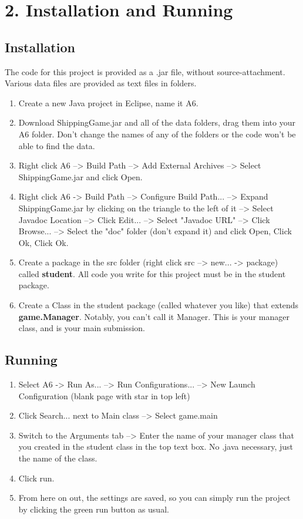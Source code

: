 \documentclass[11pt]{article}
\begin{document}
\newpage
\section{2. Installation and Running}
\subsection{Installation}
The code for this project is provided as a .jar file, without source-attachment. Various data files are provided as text files in folders.
\begin{enumerate}
\item Create a new Java project in Eclipse, name it A6.
\item Download ShippingGame.jar and all of the data folders, drag them into your A6 folder. Don't change the names of any of the folders or the code won't be able to find the data.
\item Right click A6 --> Build Path --> Add External Archives --> Select ShippingGame.jar and click Open.
\item Right click A6 -> Build Path --> Configure Build Path... --> Expand ShippingGame.jar by clicking on the triangle to the left of it --> Select Javadoc Location --> Click Edit... --> Select "Javadoc URL" --> Click Browse... --> Select the "doc" folder (don't expand it) and click Open, Click Ok, Click Ok.
\item Create a package in the src folder (right click src --> new... -> package) called \textbf{student}. All code you write for this project must be in the student package.
\item Create a Class in the student package (called whatever you like) that extends \textbf{game.Manager}. Notably, you can't call it Manager. This is your manager class, and is your main submission.
\end{enumerate}

\subsection{Running}
\begin{enumerate}
\item Select A6 -> Run As... --> Run Configurations... --> New Launch Configuration (blank page with star in top left)
\item Click Search... next to Main class --> Select game.main
\item Switch to the Arguments tab --> Enter the name of your manager class that you created in the student class in the top text box. No .java necessary, just the name of the class.
\item Click run.
\item From here on out, the settings are saved, so you can simply run the project by clicking the green run button as usual.
\end{enumerate}
\end{document}

